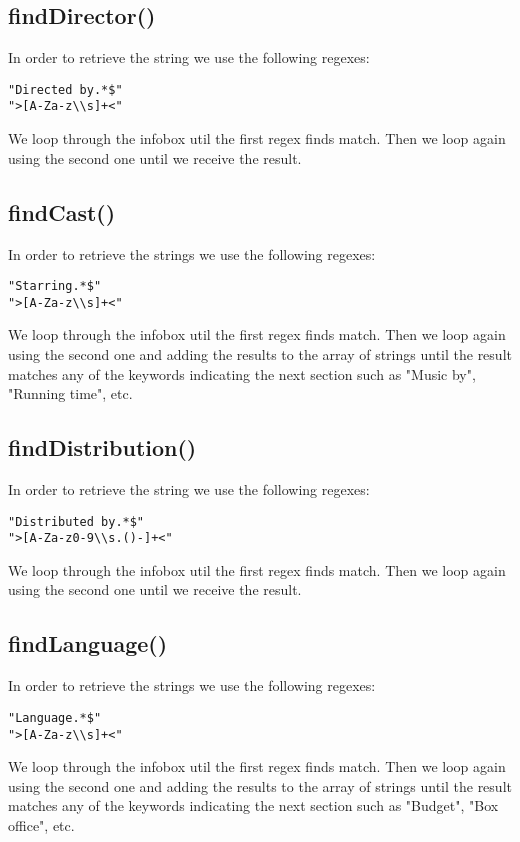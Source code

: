\documentclass[a4paper,12pt]{article}
\begin{document}
\subsection{findDirector()}
In order to retrieve the string we use the following regexes:
\begin{lstlisting}
"Directed by.*$"
">[A-Za-z\\s]+<"
\end{lstlisting}
We loop through the infobox util the first regex finds match. Then we loop again using the second one until we receive the result.

\subsection{findCast()}
In order to retrieve the strings we use the following regexes:
\begin{lstlisting}
"Starring.*$"
">[A-Za-z\\s]+<"
\end{lstlisting}
We loop through the infobox util the first regex finds match. Then we loop again using the second one and adding the results to the array of strings until the result matches any of the keywords indicating the next section such as "Music by", "Running time", etc.

\subsection{findDistribution()}
In order to retrieve the string we use the following regexes:
\begin{lstlisting}
"Distributed by.*$"
">[A-Za-z0-9\\s.()-]+<"
\end{lstlisting}
We loop through the infobox util the first regex finds match. Then we loop again using the second one until we receive the result.

\subsection{findLanguage()}
In order to retrieve the strings we use the following regexes:
\begin{lstlisting}
"Language.*$"
">[A-Za-z\\s]+<"
\end{lstlisting}
We loop through the infobox util the first regex finds match. Then we loop again using the second one and adding the results to the array of strings until the result matches any of the keywords indicating the next section such as "Budget", "Box office", etc.
\end{document}

